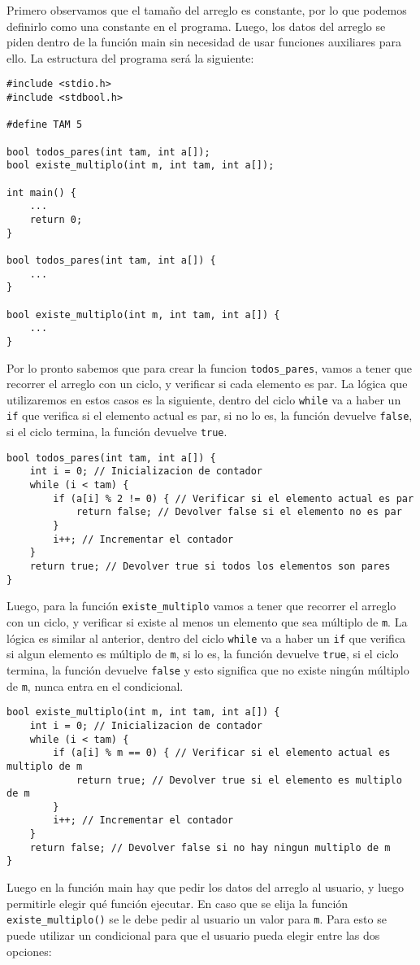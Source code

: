 \documentclass{article}
\begin{document}
Primero observamos que el tamaño del arreglo es constante, por lo que podemos definirlo como una constante en el programa. Luego, los datos del arreglo se piden dentro de la función main sin necesidad de usar funciones auxiliares para ello. La estructura del programa será la siguiente:
\begin{verbatim}
#include <stdio.h>
#include <stdbool.h>

#define TAM 5

bool todos_pares(int tam, int a[]);
bool existe_multiplo(int m, int tam, int a[]);

int main() {
    ...
    return 0;
}

bool todos_pares(int tam, int a[]) {
    ...
}

bool existe_multiplo(int m, int tam, int a[]) {
    ...
}
\end{verbatim}

Por lo pronto sabemos que para crear la funcion \texttt{todos\_pares}, vamos a tener que recorrer el arreglo con un ciclo, y verificar si cada elemento es par. La lógica que utilizaremos en estos casos es la siguiente, dentro del ciclo \texttt{while} va a haber un \texttt{if} que verifica si el elemento actual es par, si no lo es, la función devuelve \texttt{false}, si el ciclo termina, la función devuelve \texttt{true}. 
\begin{verbatim}
bool todos_pares(int tam, int a[]) {
    int i = 0; // Inicializacion de contador
    while (i < tam) {
        if (a[i] % 2 != 0) { // Verificar si el elemento actual es par
            return false; // Devolver false si el elemento no es par
        }
        i++; // Incrementar el contador
    }
    return true; // Devolver true si todos los elementos son pares
}
\end{verbatim}

Luego, para la función \texttt{existe\_multiplo} vamos a tener que recorrer el arreglo con un ciclo, y verificar si existe al menos un elemento que sea múltiplo de \texttt{m}. La lógica es similar al anterior, dentro del ciclo \texttt{while} va a haber un \texttt{if} que verifica si algun elemento es múltiplo de \texttt{m}, si lo es, la función devuelve \texttt{true}, si el ciclo termina, la función devuelve \texttt{false} y esto significa que no existe ningún múltiplo de \texttt{m}, nunca entra en el condicional.

\begin{verbatim}
bool existe_multiplo(int m, int tam, int a[]) {
    int i = 0; // Inicializacion de contador
    while (i < tam) {
        if (a[i] % m == 0) { // Verificar si el elemento actual es multiplo de m
            return true; // Devolver true si el elemento es multiplo de m
        }
        i++; // Incrementar el contador
    }
    return false; // Devolver false si no hay ningun multiplo de m
}
\end{verbatim}
Luego en la función main hay que pedir los datos del arreglo al usuario, y luego permitirle elegir qué función ejecutar. En caso que se elija la función \texttt{existe\_multiplo()} se le debe pedir al usuario un valor para \texttt{m}. Para esto se puede utilizar un condicional para que el usuario pueda elegir entre las dos opciones:
\end{document}

